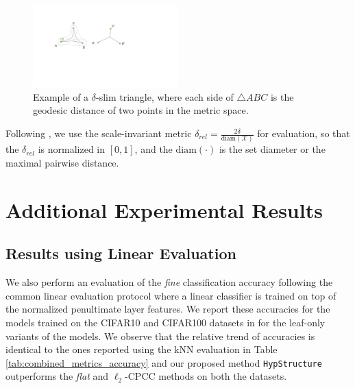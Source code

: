 \begin{figure}
    \centering
    \includegraphics[width=0.5\textwidth]{figures/delta.pdf}
    \caption{Example of a $\delta$-slim triangle, where each side of $\triangle ABC$ is the geodesic distance of two points in the metric space.}
    \label{fig:delta-slim}
\end{figure}


Following \citet{khrulkov2020hyperbolic}, we use the scale-invariant metric $\delta_{rel} = \frac{2\delta}{\text{diam}(\mathcal{X})}$ for evaluation, so that the $\delta_{rel}$ is normalized in $[0,1]$, and the $\text{diam}(\cdot)$ is the set diameter or the maximal pairwise distance.



\section{Additional Experimental Results}
\label{app:secC}


\subsection{Results using Linear Evaluation}
\label{app:sec_linear_evaluation}
We also perform an evaluation of the \emph{fine} classification accuracy following the common linear evaluation protocol \citet{2020supcon} where a linear classifier is trained on top of the normalized penultimate layer features.  We report these accuracies for the models trained on the CIFAR10 and CIFAR100 datasets in  for the leaf-only variants of the models. We observe that the relative trend of accuracies is identical to the ones reported using the kNN evaluation in Table \ref{tab:combined_metrics_accuracy} and our proposed method \texttt{HypStructure} outperforms the \emph{flat} and $\ell_2$-CPCC methods on both the datasets.

